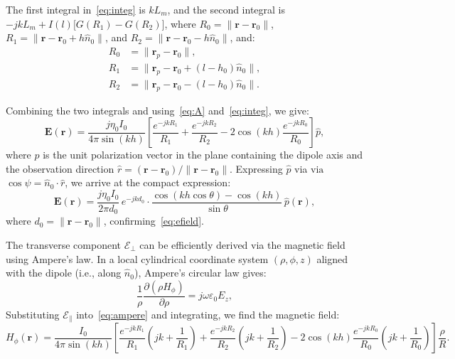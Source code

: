 \documentclass[journal]{IEEEtran}
\begin{document}
The first integral in~\eqref{eq:integ} is $kL_m$, and the second integral is $-jkL_m + I(l)\bigl[G(R_1) - G(R_2)\bigr]$, where $R_0 = \|\mathbf{r} - \mathbf{r}_0\|$, $R_1 = \|\mathbf{r} - \mathbf{r}_0 + h\hat{n}_0\|$, and $R_2 = \|\mathbf{r} - \mathbf{r}_0 - h\hat{n}_0\|$, and:
\begin{align}
    R_0 &= \|\mathbf{r}_p - \mathbf{r}_0\|, \\
    R_1 &= \|\mathbf{r}_p - \mathbf{r}_0 + (l - h_0)\hat{n}_0\|, \\
    R_2 &= \|\mathbf{r}_p - \mathbf{r}_0 - (l - h_0)\hat{n}_0\|.
\end{align}

Combining the two integrals and using~\eqref{eq:A} and~\eqref{eq:integ}, we give:
\begin{equation}
    \mathbf{E}(\mathbf{r}) = \frac{j\eta_0 I_0}{4\pi\sin(kh)}\left[\frac{e^{-jkR_1}}{R_1} + \frac{e^{-jkR_2}}{R_2} - 2\cos(kh)\frac{e^{-jkR_0}}{R_0}\right]\hat{p},
    \label{eq:Eexact}
\end{equation}
where $\hat{p}$ is the unit polarization vector in the plane containing the dipole axis and the observation direction $\hat{r} = (\mathbf{r} - \mathbf{r}_0)/\|\mathbf{r} - \mathbf{r}_0\|$. Expressing $\hat{p}$ via $\mathrm{via}$ $\cos\psi = \hat{n}_0 \cdot \hat{r}$, we arrive at the compact expression:
\begin{equation}
    \mathbf{E}(\mathbf{r}) = \frac{j\eta_0 I_0}{2\pi d_{0}}\,e^{-jkd_0}
    \cdot\frac{\cos(kh\cos\theta) - \cos(kh)}{\sin\theta}\,\hat{p}(\mathbf{r}),
\end{equation}
where $d_0 = \|\mathbf{r} - \mathbf{r}_0\|$, confirming~\eqref{eq:efield}.

The transverse component $\mathcal{E}_\perp$ can be efficiently derived via the magnetic field using Ampere's law. In a local cylindrical coordinate system $(\rho, \phi, z)$ aligned with the dipole (i.e., along $\hat{n}_0$), Ampere's circular law gives:
\begin{equation}
    \frac{1}{\rho}\frac{\partial(\rho H_\phi)}{\partial \rho} = j\omega\varepsilon_0 E_z,
    \label{eq:ampere}
\end{equation}
Substituting $\mathcal{E}_\parallel$ into~\eqref{eq:ampere} and integrating, we find the magnetic field:
\begin{equation}
    H_\phi(\mathbf{r}) = \frac{I_0}{4\pi\sin(kh)}\left[\frac{e^{-jkR_1}}{R_1}\left(jk + \frac{1}{R_1}\right)
    + \frac{e^{-jkR_2}}{R_2}\left(jk + \frac{1}{R_2}\right)
    - 2\cos(kh)\frac{e^{-jkR_0}}{R_0}\left(jk + \frac{1}{R_0}\right)\right]\frac{\rho}{R}.
\end{equation}
\end{document}
